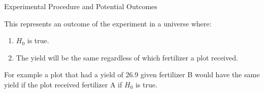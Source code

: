 \documentclass[9pt,ignorenonframetext,]{beamer}
\begin{document}
\begin{frame}{Experimental Procedure and Potential Outcomes}

This represents an outcome of the experiment in a universe where:

\begin{enumerate}
\def\labelenumi{\arabic{enumi}.}
\item
  \(H_0\) is true.
\item
  The yield will be the same regardless of which fertilizer a plot
  received.
\end{enumerate}

For example a plot that had a yield of 26.9 given fertilizer B would
have the same yield if the plot received fertilizer A if \(H_0\) is
true.

\end{frame}
\end{document}
